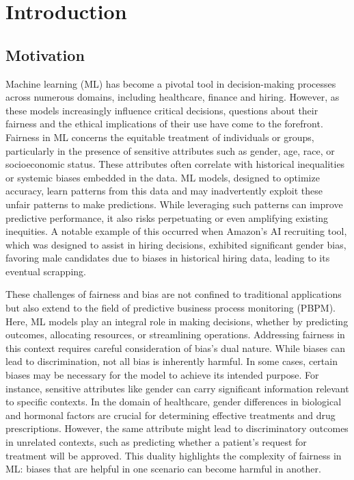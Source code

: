 %
\chapter{Introduction}

\section{Motivation}
Machine learning (ML) has become a pivotal tool in decision-making processes across numerous domains,
including healthcare, finance and hiring.
However, as these models increasingly influence critical decisions,
questions about their fairness and the ethical implications of their use have come to the forefront.
Fairness in ML concerns the equitable treatment of individuals or groups,
particularly in the presence of sensitive attributes such as gender, age, race, or socioeconomic status.
These attributes often correlate with historical inequalities or systemic biases embedded in the data.
ML models, designed to optimize accuracy,
learn patterns from this data and may inadvertently exploit these unfair patterns to make predictions.
While leveraging such patterns can improve predictive performance,
it also risks perpetuating or even amplifying existing inequities.
A notable example of this occurred when Amazon's AI recruiting tool,
which was designed to assist in hiring decisions,
exhibited significant gender bias,
favoring male candidates due to biases in historical hiring data,
leading to its eventual scrapping. \cite{amazon_bias}

These challenges of fairness and bias are not confined to traditional applications
but also extend to the field of predictive business process monitoring (PBPM).
Here, ML models play an integral role in making decisions,
whether by predicting outcomes, allocating resources, or streamlining operations.
Addressing fairness in this context requires careful consideration of bias's dual nature.
While biases can lead to discrimination, not all bias is inherently harmful.
In some cases, certain biases may be necessary for the model to achieve its intended purpose.
For instance, sensitive attributes like gender can carry significant information relevant to specific contexts.
In the domain of healthcare, gender differences in biological and hormonal factors
are crucial for determining effective treatments and drug prescriptions.
However, the same attribute might lead to discriminatory outcomes in unrelated contexts,
such as predicting whether a patient's request for treatment will be approved.
This duality highlights the complexity of fairness in ML: biases that are helpful
in one scenario can become harmful in another.

